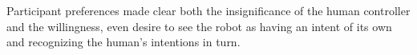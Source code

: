 \documentclass[letterpaper, 10 pt, conference]{ieeeconf}  %
\begin{document}
Participant preferences made clear both the insignificance of the human controller and the willingness, even desire to see the robot as having an intent of its own and recognizing the human's intentions in turn.








\end{document}
